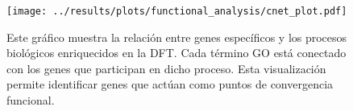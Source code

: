 \begin{figure}[htbp!]
	\centering
	\texttt{[image: ../results/plots/functional\_analysis/cnet\_plot.pdf]}
	\caption{Este gráfico muestra la relación entre genes específicos y los procesos biológicos enriquecidos en la DFT. Cada término GO está conectado con los genes que participan en dicho proceso. Esta visualización permite identificar genes que actúan como puntos de convergencia funcional.}
	\label{fig:cnet_plot}
\end{figure}


